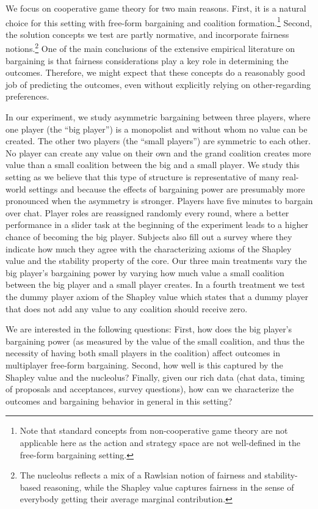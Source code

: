 We focus on cooperative game theory for two main reasons. First, it is a natural choice for this setting with free-form bargaining and coalition formation.\footnote{Note that standard concepts from non-cooperative game theory are not applicable here as the action and strategy space are not well-defined in the free-form bargaining setting.} Second, the solution concepts we test are partly normative, and incorporate fairness notions.\footnote{The nucleolus reflects a mix of a Rawlsian notion of fairness and stability-based reasoning, while the Shapley value captures fairness in the sense of everybody getting their average marginal contribution.} One of the main conclusions of the extensive empirical literature on bargaining is that fairness considerations play a key role in determining the outcomes. Therefore, we might expect that these concepts do a reasonably good job of predicting the outcomes, even without explicitly relying on other-regarding preferences.

In our experiment, we study asymmetric bargaining between three players, where one player (the ``big player'') is a monopolist and without whom no value can be created. The other two players (the ``small players'') are symmetric to each other. No player can create any value on their own and the grand coalition creates more value than a small coalition between the big and a small player. We study this setting as we believe that this type of structure is representative of many real-world settings and because the effects of bargaining power are presumably more pronounced when the asymmetry is stronger. Players have five minutes to bargain over chat. Player roles are reassigned randomly every round, where a better performance in a slider task at the beginning of the experiment leads to a higher chance of becoming the big player. Subjects also fill out a survey where they indicate how much they agree with the characterizing axioms of the Shapley value and the stability property of the core. Our three main treatments vary the big player's bargaining power by varying how much value a small coalition between the big player and a small player creates. In a fourth treatment we test the dummy player axiom of the Shapley value which states that a dummy player that does not add any value to any coalition should receive zero.


We are interested in the following questions: First, how does the big player's bargaining power (as measured by the value of the small coalition, and thus the necessity of having both small players in the coalition) affect outcomes in multiplayer free-form bargaining. Second, how well is this captured by the Shapley value and the nucleolus? Finally, given our rich data (chat data, timing of proposals and acceptances, survey questions), how can we characterize the outcomes and bargaining behavior in general in this setting?

